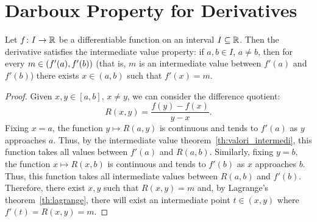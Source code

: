 \section{Darboux Property for Derivatives}

\begin{theorem}
  \label{th:darboux}%
    Let $f\colon I \to {\mathbb R}$ be a differentiable function on an interval
  $I\subseteq {\mathbb R}$.
  Then the derivative satisfies the intermediate value property:
  if $a,b\in I$, $a\neq b$, then for every $m\in \left(f'(a),f'(b)\right)$ 
  (that is, $m$ is an intermediate value between 
  $f'(a)$ and $f'(b)$)
  there exists $x\in(a,b)$ such that $f'(x) = m$. 
\end{theorem}
\begin{proof}
Given $x,y\in [a,b]$, $x\neq y$, we can consider 
the difference quotient:
  \[
    R(x,y) = \frac{f(y)-f(x)}{y-x}.
  \]
Fixing $x=a$, the function $y\mapsto R(a,y)$ is continuous and tends to $f'(a)$
as $y$ approaches $a$.
Thus, by the intermediate value theorem~\ref{th:valori_intermedi},
this function takes all values between $f'(a)$ and 
$R(a,b)$. Similarly, fixing $y=b$, the function $x\mapsto R(x,b)$ 
is continuous and tends to $f'(b)$ as $x$ approaches $b$.
Thus, this function takes all intermediate values 
between $R(a,b)$ and $f'(b)$. 
Therefore, there exist $x,y$ such 
that $R(x,y)=m$ and, by Lagrange's theorem~\ref{th:lagrange},
there will exist an intermediate point $t\in(x,y)$ where 
$f'(t)=R(x,y) = m$.
\end{proof}

